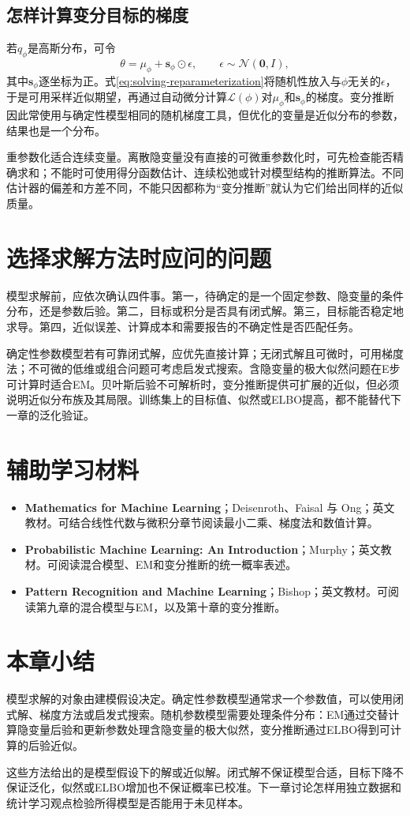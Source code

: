 \subsection{怎样计算变分目标的梯度}
若$q_\phi$是高斯分布，可令
\begin{equation}
 \theta=\mu_\phi+\bm s_\phi\odot\epsilon,
 \qquad \epsilon\sim\mathcal N(\bm0,I),
 \label{eq:solving-reparameterization}
\end{equation}
其中$\bm s_\phi$逐坐标为正。式\eqref{eq:solving-reparameterization}将随机性放入与$\phi$无关的$\epsilon$，于是可用采样近似期望，再通过自动微分计算$\mathcal L(\phi)$对$\mu_\phi$和$\bm s_\phi$的梯度。变分推断因此常使用与确定性模型相同的随机梯度工具，但优化的变量是近似分布的参数，结果也是一个分布。

重参数化适合连续变量。离散隐变量没有直接的可微重参数化时，可先检查能否精确求和；不能时可使用得分函数估计、连续松弛或针对模型结构的推断算法。不同估计器的偏差和方差不同，不能只因都称为“变分推断”就认为它们给出同样的近似质量。

\section{选择求解方法时应问的问题}

模型求解前，应依次确认四件事。第一，待确定的是一个固定参数、隐变量的条件分布，还是参数后验。第二，目标或积分是否具有闭式解。第三，目标能否稳定地求导。第四，近似误差、计算成本和需要报告的不确定性是否匹配任务。

确定性参数模型若有可靠闭式解，应优先直接计算；无闭式解且可微时，可用梯度法；不可微的低维或组合问题可考虑启发式搜索。含隐变量的极大似然问题在E步可计算时适合EM。贝叶斯后验不可解析时，变分推断提供可扩展的近似，但必须说明近似分布族及其局限。训练集上的目标值、似然或ELBO提高，都不能替代下一章的泛化验证。

\section*{辅助学习材料}
\begin{itemize}
\item \textbf{Mathematics for Machine Learning}；Deisenroth、Faisal 与 Ong；英文教材。可结合线性代数与微积分章节阅读最小二乘、梯度法和数值计算。\cite{deisenroth2020mml}
\item \textbf{Probabilistic Machine Learning: An Introduction}；Murphy；英文教材。可阅读混合模型、EM和变分推断的统一概率表述。\cite{murphy2022pml}
\item \textbf{Pattern Recognition and Machine Learning}；Bishop；英文教材。可阅读第九章的混合模型与EM，以及第十章的变分推断。\cite{bishop2006pattern}
\end{itemize}

\section{本章小结}

模型求解的对象由建模假设决定。确定性参数模型通常求一个参数值，可以使用闭式解、梯度方法或启发式搜索。随机参数模型需要处理条件分布：EM通过交替计算隐变量后验和更新参数处理含隐变量的极大似然，变分推断通过ELBO得到可计算的后验近似。

这些方法给出的是模型假设下的解或近似解。闭式解不保证模型合适，目标下降不保证泛化，似然或ELBO增加也不保证概率已校准。下一章讨论怎样用独立数据和统计学习观点检验所得模型是否能用于未见样本。
